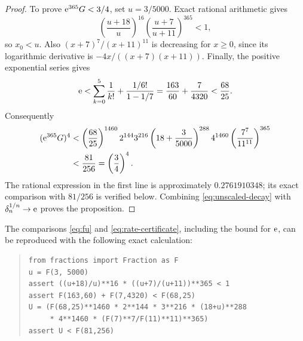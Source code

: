 \begin{proof}
To prove $\mathrm e^{365}G<3/4$, set $u=3/5000$.
Exact rational arithmetic gives
\begin{equation}\label{eq:fu}
 \left(\frac{u+18}{u}\right)^{16}
 \left(\frac{u+7}{u+11}\right)^{365}<1,
\end{equation}
so $x_0<u$. Also $(x+7)^7/(x+11)^{11}$ is decreasing for $x\geq0$,
since its logarithmic derivative is $-4x/((x+7)(x+11))$. Finally,
the positive exponential series gives
\[
 \mathrm e<\sum_{k=0}^5\frac1{k!}
              +\frac{1/6!}{1-1/7}
       =\frac{163}{60}+\frac7{4320}<\frac{68}{25}.
\]
Consequently
\begin{align}
 (\mathrm e^{365}G)^4
 &<\left(\frac{68}{25}\right)^{1460}2^{144}3^{216}
       \left(18+\frac3{5000}\right)^{288}4^{1460}
       \left(\frac{7^7}{11^{11}}\right)^{365}\notag\\
 &<\frac{81}{256}=\left(\frac34\right)^4.
 \label{eq:rate-certificate}
\end{align}
The rational expression in the first line is approximately $0.2761910348$;
its exact comparison with $81/256$ is verified below. Combining
\eqref{eq:unscaled-decay} with $\delta_n^{1/n}\to\mathrm e$ proves the proposition.
\end{proof}

The comparisons \eqref{eq:fu} and \eqref{eq:rate-certificate}, including
the bound for $\mathrm e$, can be reproduced with the following exact calculation:
\begin{quote}\small
\begin{verbatim}
from fractions import Fraction as F
u = F(3, 5000)
assert ((u+18)/u)**16 * ((u+7)/(u+11))**365 < 1
assert F(163,60) + F(7,4320) < F(68,25)
U = (F(68,25)**1460 * 2**144 * 3**216 * (18+u)**288
     * 4**1460 * (F(7)**7/F(11)**11)**365)
assert U < F(81,256)
\end{verbatim}
\end{quote}
